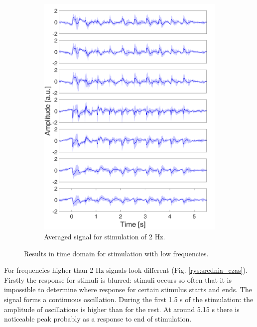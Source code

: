 \documentclass{pracalicmgr}
\begin{document}
\begin{figure}[H]
\begin{subfigure}{.5\textwidth}
		\includegraphics[width=1.\linewidth]{srednie_2Hz_5s.png}
		\caption{Averaged signal for stimulation of 2 Hz.}
		\label{rys:srednie_2Hz}
	\end{subfigure}
	\caption{Results in time domain for stimulation with low frequencies.}
	\label{rys:srednie_1_2}
	\end{figure}
    
    For frequencies higher than 2 Hz signals look different (Fig. \ref{rys:srednia_czas}). Firstly the response for stimuli is blurred: stimuli occurs so often that it is impossible to determine where response for certain stimulus starts and ends. The signal forms a continuous oscillation. During the first 1.5 s of the stimulation: the amplitude of oscillations is higher than for the rest. At around 5.15 s there is noticeable peak probably as a response to end of stimulation. 
    
\end{document}
